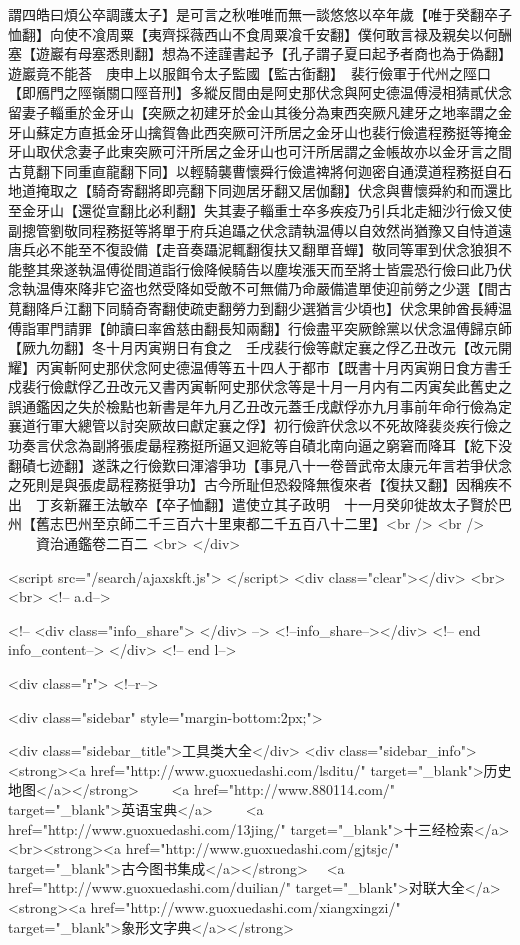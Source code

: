 謂四皓曰煩公卒調護太子】是可言之秋唯唯而無一談悠悠以卒年歲【唯于癸翻卒子恤翻】向使不飡周粟【夷齊採薇西山不食周粟飡千安翻】僕何敢言禄及親矣以何酬塞【遊巖有母塞悉則翻】想為不逹謹書起予【孔子謂子夏曰起予者商也為于偽翻】遊巖竟不能荅　庚申上以服餌令太子監國【監古衘翻】　裴行儉軍于代州之陘口【即鴈門之陘嶺關口陘音刑】多縱反間由是阿史那伏念與阿史德温傅浸相猜貳伏念留妻子輜重於金牙山【突厥之初建牙於金山其後分為東西突厥凡建牙之地率謂之金牙山蘇定方直抵金牙山擒賀魯此西突厥可汗所居之金牙山也裴行儉遣程務挺等掩金牙山取伏念妻子此東突厥可汗所居之金牙山也可汗所居謂之金帳故亦以金牙言之間古莧翻下同重直龍翻下同】以輕騎襲曹懷舜行儉遣禆將何迦密自通漠道程務挺自石地道掩取之【騎奇寄翻將即亮翻下同迦居牙翻又居伽翻】伏念與曹懷舜約和而還比至金牙山【還從宣翻比必利翻】失其妻子輜重士卒多疾疫乃引兵北走細沙行儉又使副摠管劉敬同程務挺等將單于府兵追躡之伏念請執温傅以自效然尚猶豫又自恃道遠唐兵必不能至不復設備【走音奏躡泥輒翻復扶又翻單音蟬】敬同等軍到伏念狼狽不能整其衆遂執温傅從間道詣行儉降候騎告以塵埃漲天而至將士皆震恐行儉曰此乃伏念執温傳來降非它盗也然受降如受敵不可無備乃命嚴備遣單使迎前勞之少選【間古莧翻降戶江翻下同騎奇寄翻使疏吏翻勞力到翻少選猶言少頃也】伏念果帥酋長縛温傅詣軍門請罪【帥讀曰率酋慈由翻長知兩翻】行儉盡平突厥餘黨以伏念温傅歸京師【厥九勿翻】冬十月丙寅朔日有食之　壬戌裴行儉等獻定襄之俘乙丑改元【改元開耀】丙寅斬阿史那伏念阿史德温傅等五十四人于都市【既書十月丙寅朔日食方書壬戍裴行儉獻俘乙丑改元又書丙寅斬阿史那伏念等是十月一月内有二丙寅矣此舊史之誤通鑑因之失於檢點也新書是年九月乙丑改元蓋壬戌獻俘亦九月事前年命行儉為定襄道行軍大總管以討突厥故曰獻定襄之俘】初行儉許伏念以不死故降裴炎疾行儉之功奏言伏念為副將張䖍朂程務挺所逼又迴紇等自磧北南向逼之窮窘而降耳【紇下没翻磧七迹翻】遂誅之行儉歎曰渾濬爭功【事見八十一卷晉武帝太康元年言若爭伏念之死則是與張䖍勗程務挺爭功】古今所耻但恐殺降無復來者【復扶又翻】因稱疾不出　丁亥新羅王法敏卒【卒子恤翻】遣使立其子政明　十一月癸卯徙故太子賢於巴州【舊志巴州至京師二千三百六十里東都二千五百八十二里】<br />
<br />
　　資治通鑑卷二百二  <br>
   </div> 

<script src="/search/ajaxskft.js"> </script>
 <div class="clear"></div>
<br>
<br>
 <!-- a.d-->

 <!--
<div class="info_share">
</div> 
-->
 <!--info_share--></div>   <!-- end info_content-->
  </div> <!-- end l-->

<div class="r">   <!--r-->



<div class="sidebar"  style="margin-bottom:2px;">

 
<div class="sidebar_title">工具类大全</div>
<div class="sidebar_info">
<strong><a href="http://www.guoxuedashi.com/lsditu/" target="_blank">历史地图</a></strong>　　
<a href="http://www.880114.com/" target="_blank">英语宝典</a>　　
<a href="http://www.guoxuedashi.com/13jing/" target="_blank">十三经检索</a>　
<br><strong><a href="http://www.guoxuedashi.com/gjtsjc/" target="_blank">古今图书集成</a></strong>　
<a href="http://www.guoxuedashi.com/duilian/" target="_blank">对联大全</a>　<strong><a href="http://www.guoxuedashi.com/xiangxingzi/" target="_blank">象形文字典</a></strong>　

